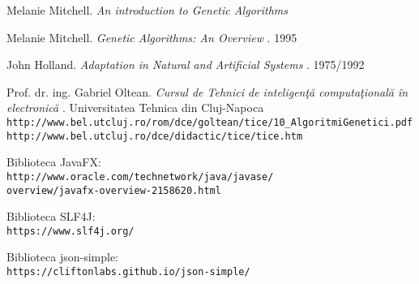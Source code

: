 \begin{thebibliography}{99}

Melanie Mitchell.
\textit{An introduction to Genetic Algorithms}

Melanie Mitchell. 
\textit{Genetic Algorithms: An Overview}
. 1995

John Holland. 
\textit{Adaptation in Natural and Artificial Systems}
. 1975/1992


Prof. dr. ing. Gabriel Oltean.
\textit{Cursul de Tehnici de inteligenţă computaţională în electronică}
. Universitatea Tehnica din Cluj-Napoca
\\\texttt{http://www.bel.utcluj.ro/rom/dce/goltean/tice/10\_AlgoritmiGenetici.pdf}
\\\texttt{http://www.bel.utcluj.ro/dce/didactic/tice/tice.htm}

Biblioteca JavaFX:\\
\texttt{http://www.oracle.com/technetwork/java/javase/}\\
\texttt{overview/javafx-overview-2158620.html}

Biblioteca SLF4J:\\
\texttt{https://www.slf4j.org/}

Biblioteca json-simple:\\
\texttt{https://cliftonlabs.github.io/json-simple/}


\end{thebibliography}